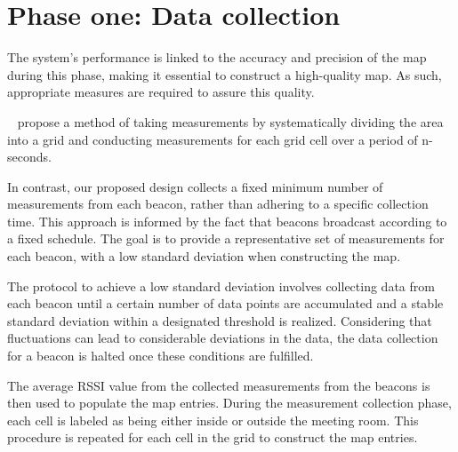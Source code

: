 \section{Phase one: Data collection}\label{sec:first_phase}
The system's performance is linked to the accuracy and precision of the map during this phase, making it essential to construct a high-quality map. As such, appropriate measures are required to assure this quality. 

\citeauthor{improving_indoor_localization}~\cite{improving_indoor_localization} propose a method of taking measurements by systematically dividing the area into a grid and conducting measurements for each grid cell over a period of n-seconds. 

In contrast, our proposed design collects a fixed minimum number of measurements from each beacon, rather than adhering to a specific collection time. This approach is informed by the fact that beacons broadcast according to a fixed schedule\cite{apple2023ibeacon}. The goal is to provide a representative set of measurements for each beacon, with a low standard deviation when constructing the map.

The protocol to achieve a low standard deviation involves collecting data from each beacon until a certain number of data points are accumulated and a stable standard deviation within a designated threshold is realized. Considering that fluctuations can lead to considerable deviations in the data, the data collection for a beacon is halted once these conditions are fulfilled.

The average RSSI value from the collected measurements from the beacons is then used to populate the map entries. During the measurement collection phase, each cell is labeled as being either inside or outside the meeting room. This procedure is repeated for each cell in the grid to construct the map entries.